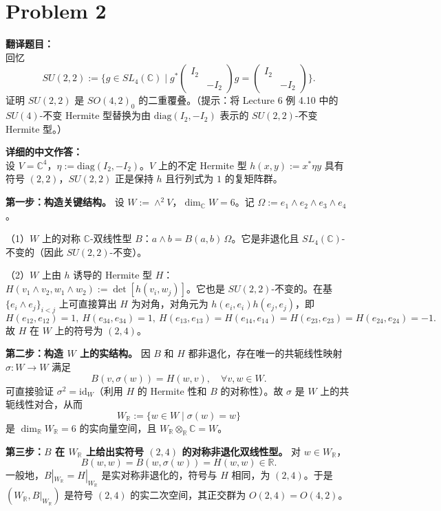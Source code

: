 \documentclass{ctexart}
\begin{document}
\vspace{2em}
\section*{Problem 2}
\textbf{翻译题目：}\\
回忆
\[
SU(2,2) := \Big\{ g \in SL_4(\mathbb{C}) \;\Big|\; g^{*} \begin{pmatrix} I_2 & \\ & -I_2 \end{pmatrix} g = \begin{pmatrix} I_2 & \\ & -I_2 \end{pmatrix} \Big\}.
\]
证明 $SU(2,2)$ 是 $SO(4,2)_0$ 的二重覆叠。（提示：将 Lecture 6 例 4.10 中的 $SU(4)$-不变 Hermite 型替换为由 $\mathrm{diag}(I_2, -I_2)$ 表示的 $SU(2,2)$-不变 Hermite 型。）

\vspace{1em}
\textbf{详细的中文作答：}\\
设 $V = \mathbb{C}^4$，$\eta := \mathrm{diag}(I_2, -I_2)$。$V$ 上的不定 Hermite 型 $h(x, y) := x^{*} \eta y$ 具有符号 $(2,2)$，$SU(2,2)$ 正是保持 $h$ 且行列式为 $1$ 的复矩阵群。

\textbf{第一步：构造关键结构。} 设 $W := \wedge^{2} V$，$\dim_\mathbb{C} W = 6$。记 $\Omega := e_1 \wedge e_2 \wedge e_3 \wedge e_4$。

（1）$W$ 上的对称 $\mathbb{C}$-双线性型 $B$：$a \wedge b = B(a, b)\,\Omega$。它是非退化且 $SL_4(\mathbb{C})$-不变的（因此 $SU(2,2)$-不变）。

（2）$W$ 上由 $h$ 诱导的 Hermite 型 $H$：$H(v_1\wedge v_2, w_1\wedge w_2) := \det[h(v_i, w_j)]$。它也是 $SU(2,2)$-不变的。在基 $\{e_i \wedge e_j\}_{i<j}$ 上可直接算出 $H$ 为对角，对角元为 $h(e_i, e_i)h(e_j, e_j)$，即
\[
H(e_{12},e_{12})=1,\ H(e_{34},e_{34})=1,\ H(e_{13},e_{13})=H(e_{14},e_{14})=H(e_{23},e_{23})=H(e_{24},e_{24})=-1.
\]
故 $H$ 在 $W$ 上的符号为 $(2, 4)$。

\textbf{第二步：构造 $W$ 上的实结构。} 因 $B$ 和 $H$ 都非退化，存在唯一的共轭线性映射 $\sigma: W \to W$ 满足
\[
B(v, \sigma(w)) = H(w, v), \quad \forall v, w \in W.
\]
可直接验证 $\sigma^{2} = \mathrm{id}_{W}$（利用 $H$ 的 Hermite 性和 $B$ 的对称性）。故 $\sigma$ 是 $W$ 上的共轭线性对合，从而
\[
W_{\mathbb{R}} := \{w \in W \mid \sigma(w) = w\}
\]
是 $\dim_{\mathbb{R}} W_{\mathbb{R}} = 6$ 的实向量空间，且 $W_{\mathbb{R}} \otimes_{\mathbb{R}} \mathbb{C} = W$。

\textbf{第三步：$B$ 在 $W_{\mathbb{R}}$ 上给出实符号 $(2,4)$ 的对称非退化双线性型。} 对 $w \in W_{\mathbb{R}}$，
\[
B(w, w) = B(w, \sigma(w)) = H(w, w) \in \mathbb{R}.
\]
一般地，$B|_{W_{\mathbb{R}}} = H|_{W_{\mathbb{R}}}$ 是实对称非退化的，符号与 $H$ 相同，为 $(2, 4)$。于是 $(W_{\mathbb{R}}, B|_{W_{\mathbb{R}}})$ 是符号 $(2,4)$ 的实二次空间，其正交群为 $O(2,4) = O(4,2)$。
\end{document}
